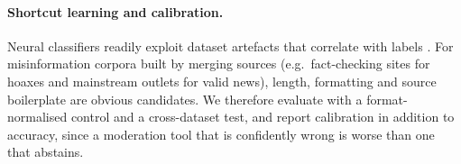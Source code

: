 \paragraph{Shortcut learning and calibration.}
Neural classifiers readily exploit dataset artefacts that correlate with labels
\citep{gururangan2018annotation,mccoy2019right,geirhos2020shortcut}. For misinformation corpora built
by merging sources (e.g.\ fact-checking sites for hoaxes and mainstream outlets for valid news), length,
formatting and source boilerplate are obvious candidates. We therefore evaluate with a format-normalised
control and a cross-dataset test, and report calibration \citep{naeini2015ece,guo2017calibration} in
addition to accuracy, since a moderation tool that is confidently wrong is worse than one that abstains.
